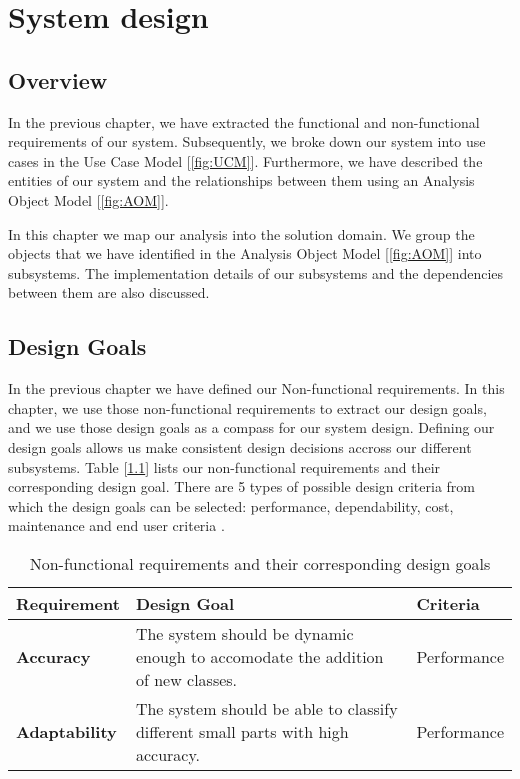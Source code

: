\chapter{System design}

\section{Overview}

In the previous chapter, we have extracted the functional and non-functional requirements of our system. Subsequently, we broke down our system into use cases in the Use Case Model [\ref{fig:UCM}]. Furthermore, we have described the entities of our system and the relationships between them using an Analysis Object Model [\ref{fig:AOM}].

In this chapter we map our analysis into the solution domain. We group the objects that we have identified in the Analysis Object Model [\ref{fig:AOM}] into subsystems. The implementation details of our subsystems and the dependencies between them are also discussed.

\section{Design Goals}

In the previous chapter we have defined our Non-functional requirements. In this chapter, we use those non-functional requirements to extract our design goals, and we use those design goals as a compass for our system design. Defining our design goals allows us make consistent design decisions accross our different subsystems. Table [\ref{tab:DG}] lists our non-functional requirements and their corresponding design goal. There are 5 types of possible design criteria from which the design goals can be selected: performance, dependability, cost, maintenance and end user criteria \cite{bruegge2004object}.

\begin{table}
  \centering
  \begin{tabular}{ | l | p{5cm} | l | }
    \hline
    \textbf{Requirement} & \textbf{Design Goal} & \textbf{Criteria} \\ \hline
    \textbf{Accuracy} & The system should be dynamic enough to accomodate the addition of new classes. & Performance \\ \hline
    \textbf{Adaptability} & The system should be able to classify different small parts with high accuracy. & Performance \\ \hline
  \end{tabular}
  \caption{Non-functional requirements and their corresponding design goals}
  \label{tab:DG}
\end{table}

